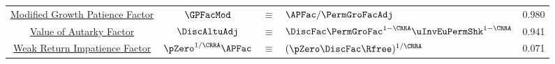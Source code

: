 \begin{table}
{\begin{tabular}{|c|ccl|c|}
        \hyperlink{GPFacRawDefn}{Modified Growth Patience Factor}                      & $\GPFacMod$ & $\equiv$ & $ \APFac/\PermGroFacAdj$& 0.980 \\
        \hyperlink{VAFacDefn}{Value of Autarky Factor}         & $\DiscAltuAdj $ & $\equiv$ & $ \DiscFac \PermGroFac^{1-\CRRA}\uInvEuPermShk^{1-\CRRA}$       & 0.941 \\
        \hyperlink{WRIC}{Weak Return Impatience Factor}         & $\pZero^{1/\CRRA} \APFac $ & $\equiv$ & $ (\pZero \DiscFac \Rfree)^{1/\CRRA}$       & 0.071 \\ \hline
      \end{tabular}
    } %

    \settowidth\TableWidth{\usebox{\TblBox}}
    \savebox{\TblShrunkBox}{
      \settowidth{\TblShrunk}{\usebox{\TblBox}}
      \resizebox{0.9\textwidth}{!}{\begin{minipage}{\TblShrunk}
          \usebox{\TblBox}
        \end{minipage}}
    }

    \usebox{\TblShrunkBox}


  \end{table}
